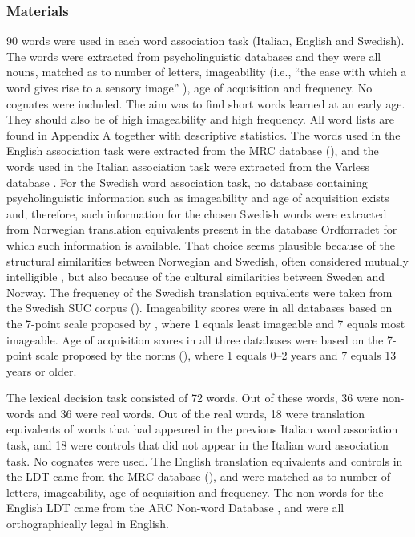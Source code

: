 \documentclass[output=paper,colorlinks,citecolor=brown,nonflat]{langsci/langscibook}
\begin{document}
\subsubsection{Materials}\label{sec:gudmundson:2.2.3}

 90 words were used in each word association task (Italian, English and Swedish). The words were extracted from psycholinguistic databases and they were all nouns, matched as to number of letters, imageability (i.e., “the ease with which a word gives rise to a sensory image” \citealt[73]{BirdEtAl2001}), age of acquisition and frequency. No cognates were included. The aim was to find short words learned at an early age. They should also be of high imageability and high frequency. All word lists are found in Appendix A together with descriptive statistics. The words used in the English association task were extracted from the MRC database (\citealt{Coltheart1981, Wilson1988}), and the words used in the Italian association task were extracted from the Varless database \citep{BuraniEtAl2001}. For the Swedish word association task, no database containing psycholinguistic information such as imageability and age of acquisition exists and, therefore, such information for the chosen Swedish words were extracted from Norwegian translation equivalents present in the database Ordforradet \citep{LindEtAl2013} for which such information is available. That choice seems plausible because of the structural similarities between Norwegian and Swedish, often considered mutually intelligible \citep{Gooskens2010}, but also because of the cultural similarities between Sweden and Norway. The frequency of the Swedish translation equivalents were taken from the Swedish SUC corpus (\citealt{Gustafson-CapkováHartmann2006}). Imageability scores were in all databases based on the 7-point scale proposed by \citet{PaivioEtAl1968}, where 1 equals least imageable and 7 equals most imageable. Age of acquisition scores in all three databases were based on the 7-point scale proposed by the \citeauthor{GilhoolyLogie1980} norms (\citeyear{GilhoolyLogie1980}), where 1 equals 0--2 years and 7 equals 13 years or older.

 The lexical decision task consisted of 72 words. Out of these words, 36 were non-words and 36 were real words. Out of the real words, 18 were translation equivalents of words that had appeared in the previous Italian word association task, and 18 were controls that did not appear in the Italian word association task. No cognates were used. The English translation equivalents and controls in the LDT came from the MRC database (\citealt{Coltheart1981, Wilson1988}), and were matched as to number of letters, imageability, age of acquisition and frequency. The non-words for the English LDT came from the ARC Non-word Database \citep{RastleEtAl2002}, and were all orthographically legal in English.
\end{document}
